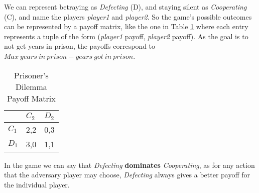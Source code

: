 We can represent betraying as \textit{Defecting} (D), and staying silent as \textit{Cooperating} (C), and name the players \textit{player1} and \textit{player2}. So the game's possible outcomes can be represented by a payoff matrix, like the one in Table \ref{PrisonerDilemaPayoffMatrix} where each entry represents a tuple of the form (\textit{player1} payoff, \textit{player2} payoff). As the goal is to not get years in prison, the payoffs correspond to $Max\ years\ in\ prison - years\ got\ in\ prison$.

\begin{table}[]
	\centering
	\begin{tabular}{l|l|l|}
		\cline{2-3}
		& $C_2$   & $D_2$   \\ \hline
		\multicolumn{1}{|l|}{$C_1$} & 2,2 & 0,3 \\ \hline
		\multicolumn{1}{|l|}{$D_1$} & 3,0 & 1,1 \\ \hline
	\end{tabular}
	\caption{Prisoner's Dilemma Payoff Matrix}
	\label{PrisonerDilemaPayoffMatrix}
\end{table}	

In the game we can say that \textit{Defecting} \textbf{dominates} \textit{Cooperating}, as for any action that the adversary player may choose, \textit{Defecting} always gives a better payoff for the individual player\cite{Nash1951}.

